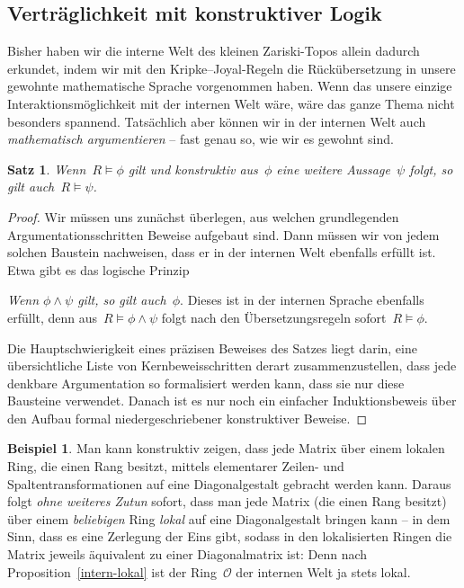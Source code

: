 \documentclass[a4paper,ngerman,12pt]{scrartcl}
\theoremstyle{definition}
\newtheorem{bsp}[defn]{Beispiel}
\theoremstyle{plain}
\newtheorem{satz}[defn]{Satz}
\theoremstyle{remark}
\renewcommand{\O}{\mathcal{O}}
\renewcommand{\_}{\mathpunct{.}\,}
\newcommand{\?}{\,{:}\,}
\newenvironment{indentblock}{%
  \list{}{\leftmargin\leftmargin}%
  \item\relax
}{%
  \endlist
}
\begin{document}
\subsection{Verträglichkeit mit konstruktiver Logik}

Bisher haben wir die interne Welt des kleinen Zariski-Topos allein dadurch
erkundet, indem wir mit den Kripke--Joyal-Regeln die Rückübersetzung in unsere
gewohnte mathematische Sprache vorgenommen haben. Wenn das unsere einzige
Interaktionsmöglichkeit mit der internen Welt wäre, wäre das ganze Thema nicht
besonders spannend. Tatsächlich aber können wir in der internen Welt auch
\emph{mathematisch argumentieren} -- fast genau so, wie wir es gewohnt sind.

\begin{satz}\label{soundness}%
Wenn~$R \models \phi$ gilt und konstruktiv aus~$\phi$ eine weitere
Aussage~$\psi$ folgt, so gilt auch~$R \models \psi$.\end{satz}
\begin{proof}Wir müssen uns
zunächst überlegen, aus welchen grundlegenden Argumentationsschritten Beweise
aufgebaut sind. Dann müssen wir von jedem solchen Baustein nachweisen,
dass er in der internen Welt ebenfalls erfüllt ist. Etwa gibt es das logische
Prinzip
\begin{indentblock}\emph{Wenn $\phi \wedge \psi$ gilt, so gilt auch~$\phi$}.
\end{indentblock}
Dieses ist in der internen Sprache ebenfalls erfüllt, denn aus~$R \models \phi
\wedge \psi$ folgt nach den Übersetzungsregeln sofort~$R \models \phi$.

Die Hauptschwierigkeit eines präzisen Beweises des Satzes liegt darin,
eine über\-sicht\-li\-che Liste von Kernbeweisschritten derart zusammenzustellen,
dass jede denkbare Argumentation so formalisiert werden kann, dass sie nur diese
Bausteine verwendet. Danach ist es nur noch ein einfacher Induktionsbeweis über den
Aufbau formal niedergeschriebener konstruktiver Beweise.
\end{proof}

\begin{bsp}Man kann konstruktiv zeigen, dass jede Matrix über einem lokalen
Ring, die einen Rang besitzt, mittels elementarer Zeilen- und Spaltentransformationen auf eine
Diagonalgestalt gebracht werden kann. Daraus folgt \emph{ohne weiteres Zutun}
sofort, dass man jede Matrix (die einen Rang besitzt) über einem
\emph{beliebigen} Ring \emph{lokal} auf eine Diagonalgestalt bringen kann -- in dem Sinn, dass es
eine Zerlegung der Eins gibt, sodass in den lokalisierten Ringen die Matrix
jeweils äquivalent zu einer Diagonalmatrix ist: Denn nach Proposition~\ref{intern-lokal}
ist der Ring~$\O$ der internen Welt ja stets lokal.\end{bsp}
\end{document}
